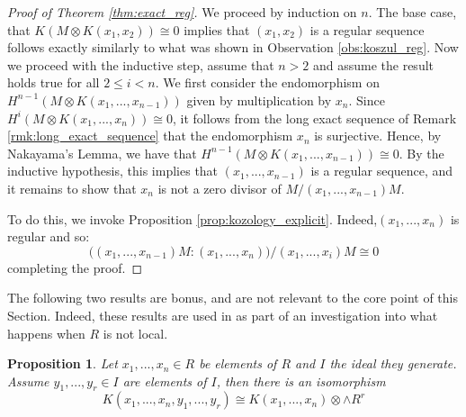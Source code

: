 \documentclass[12pt]{article}
\theoremstyle{plain}
\newtheorem{proposition}[thm]{Proposition}
\theoremstyle{definition}
\begin{document}
\begin{proof}[Proof of Theorem \ref{thm:exact_reg}]
	We proceed by induction on $n$. The base case, that $K(M \otimes K(x_1,x_2)) \cong 0$ implies that $(x_1,x_2)$ is a regular sequence follows exactly similarly to what was shown in Observation \ref{obs:koszul_reg}. Now we proceed with the inductive step, assume that $n >2$ and assume the result holds true for all $2 \leq i < n$. We first consider the endomorphism on $H^{n-1}(M \otimes K(x_1,...,x_{n-1}))$ given by multiplication by $x_n$. Since $H^i(M \otimes K(x_1,...,x_n)) \cong 0$, it follows from the long exact sequence of Remark \ref{rmk:long_exact_sequence} that the endomorphism $x_n$ is surjective. Hence, by Nakayama's Lemma, we have that $H^{n-1}(M \otimes K(x_1,...,x_{n-1})) \cong 0$. By the inductive hypothesis, this implies that $(x_1,...,x_{n-1})$ is a regular sequence, and it remains to show that $x_n$ is not a zero divisor of $M/(x_1,...,x_{n-1})M$.
	
	To do this, we invoke Proposition \ref{prop:kozology_explicit}. Indeed,$(x_1,...,x_n)$ is regular and so:
	\begin{equation}
		\big((x_1,...,x_{n-1})M:(x_1,...,x_n)\big)/(x_1,...,x_i)M \cong 0
	\end{equation}
	completing the proof.
\end{proof}
The following two results are bonus, and are not relevant to the core point of this Section. Indeed, these results are used in \cite[\S17.3]{view} as part of an investigation into what happens when $R$ is not local.
\begin{proposition}\label{prop:in_gen_ideal}
	Let $x_1,...,x_n \in R$ be elements of $R$ and $I$ the ideal they generate. Assume $y_1,...,y_r \in I$ are elements of $I$, then there is an isomorphism
	\begin{equation}
		K(x_1,...,x_n,y_1,...,y_r) \cong K(x_1,...,x_n) \otimes \wedge R^r
	\end{equation}
\end{proposition}
\end{document}
